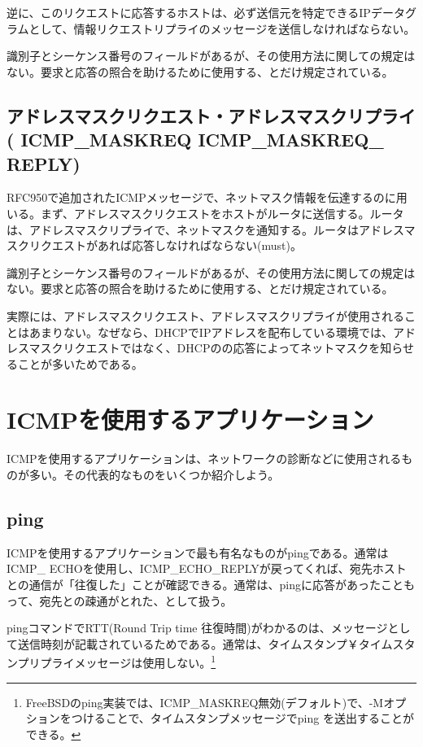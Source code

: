 逆に、このリクエストに応答するホストは、必ず送信元を特定できるIPデータグラムとして、情報リクエストリプライのメッセージを送信しなければならない。

識別子とシーケンス番号のフィールドがあるが、その使用方法に関しての規定はない。要求と応答の照合を助けるために使用する、とだけ規定されている。

\subsection{アドレスマスクリクエスト・アドレスマスクリプライ( ICMP\_MASKREQ ICMP\_MASKREQ\_ REPLY)}

RFC950で追加されたICMPメッセージで、ネットマスク情報を伝達するのに用いる。まず、アドレスマスクリクエストをホストがルータに送信する。ルータは、アドレスマスクリプライで、ネットマスクを通知する。ルータはアドレスマスクリクエストがあれば応答しなければならない(must)。

識別子とシーケンス番号のフィールドがあるが、その使用方法に関しての規定はない。要求と応答の照合を助けるために使用する、とだけ規定されている。

実際には、アドレスマスクリクエスト、アドレスマスクリプライが使用されることはあまりない。なぜなら、DHCPでIPアドレスを配布している環境では、アドレスマスクリクエストではなく、DHCPのの応答によってネットマスクを知らせることが多いためである。

\section{ICMPを使用するアプリケーション}

ICMPを使用するアプリケーションは、ネットワークの診断などに使用されるものが多い。その代表的なものをいくつか紹介しよう。

\subsection{ping}

ICMPを使用するアプリケーションで最も有名なものがpingである。通常はICMP\_ ECHOを使用し、ICMP\_ECHO\_REPLYが戻ってくれば、宛先ホストとの通信が「往復した」ことが確認できる。通常は、pingに応答があったこともって、宛先との疎通がとれた、として扱う。

pingコマンドでRTT(Round Trip time 往復時間)がわかるのは、メッセージとして送信時刻が記載されているためである。通常は、タイムスタンプ￥タイムスタンプリプライメッセージは使用しない。\footnote{FreeBSDのping実装では、ICMP\_MASKREQ無効(デフォルト)で、-Mオプションをつけることで、タイムスタンプメッセージでping を送出することができる。}

